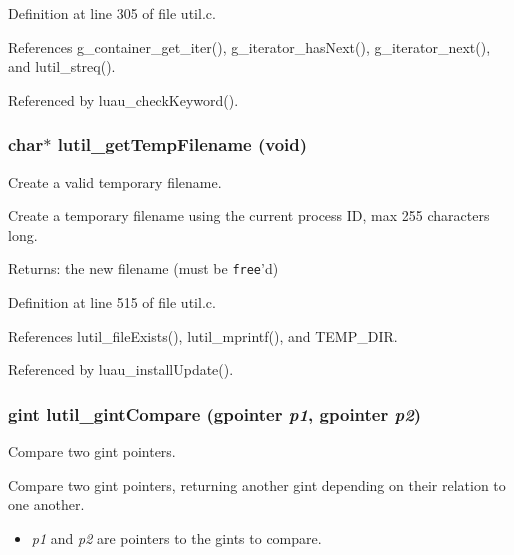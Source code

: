 Definition at line 305 of file util.c.

References g\_\-container\_\-get\_\-iter(), g\_\-iterator\_\-has\-Next(), g\_\-iterator\_\-next(), and lutil\_\-streq().

Referenced by luau\_\-check\-Keyword().
\subsubsection{\setlength{\rightskip}{0pt plus 5cm}char$\ast$ lutil\_\-get\-Temp\-Filename (void)}\label{util_8c_a16}


Create a valid temporary filename. 

Create a temporary filename using the current process ID, max 255 characters long.

\begin{Desc}
\item[Returns:]the new filename (must be {\tt free}'d) \end{Desc}


Definition at line 515 of file util.c.

References lutil\_\-file\-Exists(), lutil\_\-mprintf(), and TEMP\_\-DIR.

Referenced by luau\_\-install\-Update().
\subsubsection{\setlength{\rightskip}{0pt plus 5cm}gint lutil\_\-gint\-Compare (gpointer {\em p1}, gpointer {\em p2})}\label{util_8c_a19}


Compare two gint pointers. 

Compare two gint pointers, returning another gint depending on their relation to one another.

\begin{itemize}
\item {\em p1\/} and {\em p2\/} are pointers to the gints to compare. 
\end{itemize}


